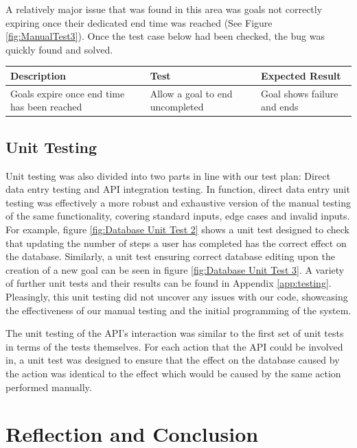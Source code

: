 \documentclass[11pt]{article}
\begin{document}
A relatively major issue that was found in this area was goals not correctly 
expiring once their dedicated end time was reached 
(See Figure \ref{fig:ManualTest3}). Once the test case below had been checked, 
the bug was quickly found and solved.\par
\begin{center}
    \begin{tabular}{|p{5cm}|p{5cm}|p{5cm}|}
        \hline
        \textbf{Description} & \textbf{Test} & \textbf{Expected Result}\\
        \hline
        Goals expire once end time has been reached 
        & Allow a goal to end uncompleted 
        & Goal shows failure and ends\\
        \hline
    \end{tabular}
\end{center}
\subsection{Unit Testing}
Unit testing was also divided into two parts in line with our test plan: 
Direct data entry testing and API integration testing. In function, direct 
data entry unit testing was effectively a more robust and exhaustive version 
of the manual testing of the same functionality, covering standard inputs, 
edge cases and invalid inputs. For example, figure \ref{fig:Database Unit Test 2} 
shows a unit test designed to check that updating the number of steps a user has 
completed has the correct effect on the database. Similarly, a unit test 
ensuring correct database editing upon the creation of a new goal can be seen 
in figure \ref{fig:Database Unit Test 3}. A variety of further unit tests and 
their results can be found in Appendix \ref{app:testing}. Pleasingly, this unit 
testing did not uncover any issues with our code, showcasing the effectiveness of 
our manual testing and the initial programming of the system.\par

The unit testing of the API's interaction was similar to the first set of unit 
tests in terms of the tests themselves. For each action that the API could be 
involved in, a unit test was designed to ensure that the effect on the database 
caused by the action was identical to the effect which would be caused by the same 
action performed manually.\par



\section{Reflection and Conclusion}
\end{document}
